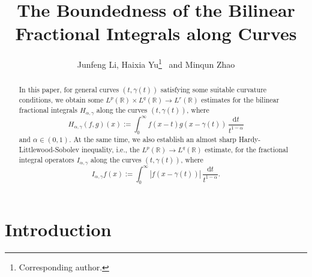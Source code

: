\documentclass[11pt, twoside, leqno]{article}
\theoremstyle{definition}
\numberwithin{equation}{section}
\begin{document}
\arraycolsep=1pt



\title{\bf\Large The Boundedness of the Bilinear Fractional Integrals along Curves
}
\author{Junfeng Li, Haixia Yu\footnote{Corresponding author.} ~and Minqun Zhao}


\date{}



\maketitle

\vspace{-0.7cm}

\begin{abstract}
 In this paper, for general curves $(t,\gamma(t))$ satisfying some suitable curvature conditions, we obtain some $L^p(\mathbb{R})\times L^q(\mathbb{R}) \rightarrow L^r(\mathbb{R})$ estimates for the bilinear fractional integrals $H_{\alpha,\gamma}$ along the curves $(t,\gamma(t))$, where
 $$H_{\alpha,\gamma}(f,g)(x):=\int_{0}^{\infty}f(x-t)g(x-\gamma(t))\,\frac{\textrm{d}t}{t^{1-\alpha}}$$
 and $\alpha\in (0,1)$. At the same time, we also establish an almost sharp Hardy-Littlewood-Sobolev inequality, i.e., the $L^p(\mathbb{R})\rightarrow L^q(\mathbb{R})$ estimate, for the fractional integral operators $I_{\alpha,\gamma}$ along the curves $(t,\gamma(t))$, where
$$I_{\alpha,\gamma}f(x):=\int_{0}^{\infty}\left|f(x-\gamma(t))\right|\,\frac{\textrm{d}t}{t^{1-\alpha}}.$$
\end{abstract}


\section{Introduction}
\end{document}
